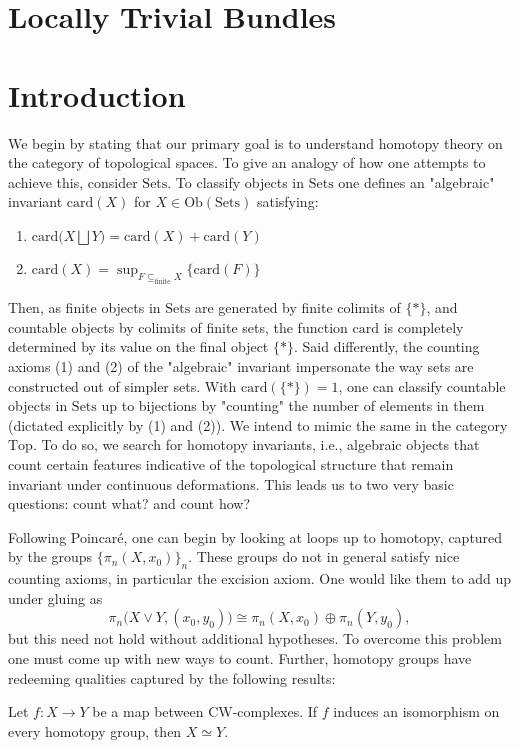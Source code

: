 \documentclass[11pt,a4paper]{article}
\begin{document}
\section*{Locally Trivial Bundles}
\section{Introduction}


We begin by stating that our primary goal is to understand homotopy theory on the category of topological spaces. To give an analogy of how one attempts to achieve this, consider $\text{Sets}$. To classify objects in $\text{Sets}$ one defines an "algebraic" invariant $\text{card}(X)$ for $X \in \text{Ob}(\text{Sets})$ satisfying:

\begin{enumerate}
    \item $\text{card}\big(X \bigsqcup Y\big) = \text{card}(X) + \text{card}(Y)$
    \item $\text{card}(X) = \sup_{F \subseteq_{\text{finite}} X}{\big\{\text{card}(F)\big\}}$
\end{enumerate}
Then, as finite objects in $\text{Sets}$ are generated by finite colimits of $\{*\}$, and countable objects by colimits of finite sets, the function
$\text{card}$ is completely determined by its value on the final object $\{*\}$. Said differently, the counting axioms (1) and (2) of the "algebraic" invariant impersonate the way sets are constructed out of simpler sets. With $\text{card}(\{*\}) = 1$, one can classify countable objects in $\text{Sets}$ up to bijections by "counting" the number of elements in them (dictated explicitly by (1) and (2)). We intend to mimic the same in the category $\text{Top}$. To do so, we search for homotopy invariants, i.e., algebraic objects that count certain features indicative of the topological structure that remain invariant under continuous deformations. This leads us to two very basic questions: count what? and count how?

Following Poincar\'e, one can begin by looking at loops up to homotopy, captured by the groups $\{\pi_n(X, x_0)\}_n$. These groups do not in general satisfy nice counting axioms, in particular the excision axiom. One would like them to add up under gluing as
\[
\pi_n\bigl(X\vee Y,(x_0,y_0)\bigr)
\cong \pi_n(X,x_0)\oplus\pi_n(Y,y_0),
\]
but this need not hold without additional hypotheses. To overcome this problem one must come up with new ways to count. Further, homotopy groups have redeeming qualities captured by the following results:
\begin{theorem}[Whitehead]
Let $f:X\to Y$ be a map between CW-complexes. If $f$ induces an isomorphism on every homotopy group, then $X\simeq Y$.
\end{theorem}
\end{document}
